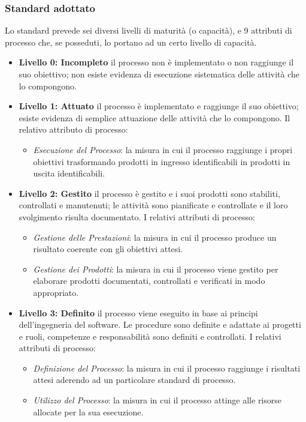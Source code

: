 		\subsubsection{Standard adottato}
		Lo standard prevede sei diversi livelli di maturità (o capacità), e 9 attributi di processo che, se posseduti, lo portano ad un certo livello di 			capacità.
		\begin{itemize}
		\item \textbf{Livello 0: Incompleto} il processo non è implementato o non raggiunge il suo obiettivo;   non esiste evidenza di esecuzione 					sistematica delle attività che lo compongono.
		 \item \textbf{Livello 1: Attuato} il processo è implementato e raggiunge il suo obiettivo; esiste evidenza di semplice attuazione delle attività 			che lo compongono.
		Il relativo attributo di processo:
			\begin{itemize}
				\item \emph{Esecuzione del Processo}: la misura in cui il processo raggiunge i propri obiettivi trasformando   prodotti in ingresso 						identificabili in prodotti in uscita identificabili.
			\end{itemize}
		\item \textbf{Livello 2: Gestito} il processo è gestito e i suoi prodotti sono stabiliti, controllati e manutenuti; le attività sono pianificate e 			controllate e il loro svolgimento risulta documentato.
		I relativi attributi di processo:
			\begin{itemize}
				\item \emph{Gestione delle Prestazioni}: la misura in cui il processo produce un risultato coerente con gli obiettivi attesi.
				\item \emph{Gestione dei Prodotti}: la misura in cui il processo viene gestito per elaborare prodotti documentati, controllati e verificati in modo appropriato.
			\end{itemize}
 	
		\item \textbf{Livello 3: Definito} il processo viene eseguito in base ai principi dell'ingegneria del software. Le procedure sono definite e adattate ai progetti e ruoli, competenze e responsabilità sono definiti e controllati.
		I relativi attributi di processo:
			\begin{itemize}
				\item \emph{Definizione del Processo}: la misura in cui il processo raggiunge i risultati attesi aderendo ad un particolare standard di processo.
				\item \emph{Utilizzo del Processo}: la misura in cui il processo attinge alle risorse allocate per la sua esecuzione.	
			\end{itemize}
			

\end{itemize}
